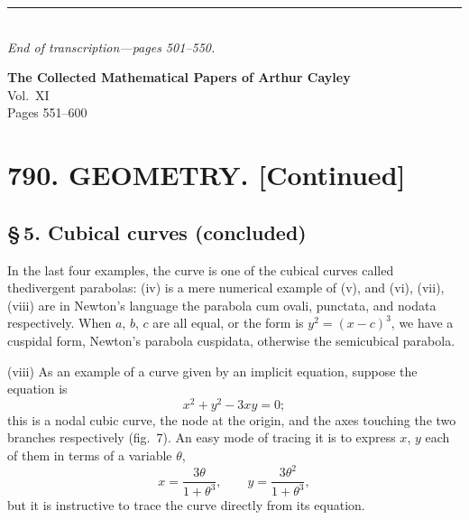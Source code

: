 \documentclass[11pt,a4paper]{book}
\begin{document}
\vspace{\baselineskip}
\begin{center}
\rule{0.5\textwidth}{0.4pt}\\[4pt]
\textit{End of transcription---pages 501--550.}
\end{center}
\clearpage


\begin{center}
{\Large\bfseries The Collected Mathematical Papers of Arthur Cayley}\\[6pt]
{\large Vol.~XI}\\[12pt]
{\large Pages 551--600}\\[24pt]
\end{center}


\newpage

\section*{790. GEOMETRY. [Continued]}

\subsection*{\S\,5. Cubical curves (concluded)}

In the last four examples, the curve is one of the cubical curves called the\break divergent parabolas: (iv) is a mere numerical example of (v), and (vi), (vii), (viii) are in Newton's language the parabola cum ovali, punctata, and nodata respectively. When $a$, $b$, $c$ are all equal, or the form is $y^2=(x-c)^3$, we have a cuspidal form, Newton's parabola cuspidata, otherwise the semicubical parabola.

(viii) As an example of a curve given by an implicit equation, suppose the equation is
\[
x^2 + y^2 - 3xy = 0;
\]
this is a nodal cubic curve, the node at the origin, and the axes touching the two branches respectively (fig.~7). An easy mode of tracing it is to express $x$, $y$ each of them in terms of a variable $\theta$,
\[
x = \frac{3\theta}{1+\theta^3},\qquad y = \frac{3\theta^2}{1+\theta^3},
\]
but it is instructive to trace the curve directly from its equation.
\end{document}
